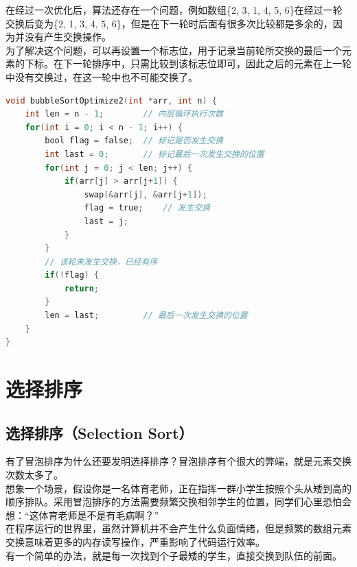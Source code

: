 在经过一次优化后，算法还存在一个问题，例如数组\{2, 3, 1, 4, 5, 6\}在经过一轮交换后变为\{2, 1, 3, 4, 5, 6\}，但是在下一轮时后面有很多次比较都是多余的，因为并没有产生交换操作。 \\

为了解决这个问题，可以再设置一个标志位，用于记录当前轮所交换的最后一个元素的下标。在下一轮排序中，只需比较到该标志位即可，因此之后的元素在上一轮中没有交换过，在这一轮中也不可能交换了。 \\


\begin{lstlisting}[language=C]
void bubbleSortOptimize2(int *arr, int n) {
    int len = n - 1;        // 内层循环执行次数
    for(int i = 0; i < n - 1; i++) {
        bool flag = false;  // 标记是否发生交换
        int last = 0;       // 标记最后一次发生交换的位置
        for(int j = 0; j < len; j++) {
            if(arr[j] > arr[j+1]) {
                swap(&arr[j], &arr[j+1]);
                flag = true;    // 发生交换
                last = j;
            }
        }
        // 该轮未发生交换，已经有序
        if(!flag) {
            return;
        }
        len = last;         // 最后一次发生交换的位置
    }
}
\end{lstlisting}

\newpage

\section{选择排序}

\subsection{选择排序（Selection Sort）}

有了冒泡排序为什么还要发明选择排序？冒泡排序有个很大的弊端，就是元素交换次数太多了。 \\

想象一个场景，假设你是一名体育老师，正在指挥一群小学生按照个头从矮到高的顺序排队。采用冒泡排序的方法需要频繁交换相邻学生的位置，同学们心里恐怕会想：“这体育老师是不是有毛病啊？” \\

在程序运行的世界里，虽然计算机并不会产生什么负面情绪，但是频繁的数组元素交换意味着更多的内存读写操作，严重影响了代码运行效率。 \\

有一个简单的办法，就是每一次找到个子最矮的学生，直接交换到队伍的前面。 \\

